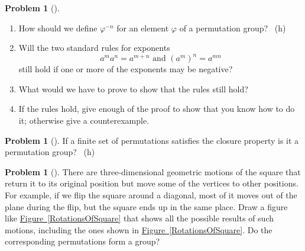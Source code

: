 \documentclass[10pt,]{book}
\theoremstyle{plain}
\theoremstyle{definition}
\newtheorem{activity}[project]{Problem}
\theoremstyle{definition}
\numberwithin{equation}{chapter}
\begin{document}
\begin{activity}[] \label{activity-253}
\leavevmode%
\begin{enumerate}[font=\bfseries,label=(\alph*),ref=\alph*]
\item\label{task-186} \marginsymbol[-2.5em]{} \hypertarget{p-1470}{}%
How should we define \(\varphi^{-n}\) for an element \(\varphi\) of a permutation group?%
~{\tiny (h)}\item\label{task-187} \marginsymbol[-2.5em]{} \hypertarget{p-1473}{}%
Will the two standard rules for exponents%
\begin{equation*}
a^ma^n=a^{m+n} \mbox{\ and\ }  (a^m)^n = a^{mn}
\end{equation*}
still hold if one or more of the exponents may be negative?%
\item\label{task-188} \marginsymbol[-2.5em]{} \hypertarget{p-1475}{}%
What would we have to prove to show that the rules still hold?%
\item\label{task-189} \marginsymbol[-2.5em]{} \hypertarget{p-1477}{}%
If the rules hold, give enough of the proof to show that you know how to do it; otherwise give a counterexample.%
\end{enumerate}
\end{activity}
\begin{activity}[] \label{activity-254}
\hypertarget{p-1481}{}%
If a finite set of permutations satisfies the closure property is it a permutation group?%
~{\tiny (h)}\end{activity}
\begin{activity}[] \label{dihedral1}
\hypertarget{p-1484}{}%
There are three-dimensional geometric motions of the square that return it to its original position but move some of the vertices to other positions. For example, if we flip the square around a diagonal, most of it moves out of the plane during the flip, but the square ends up in the same place. Draw a figure like \hyperref[RotationsOfSquare]{Figure~\ref{RotationsOfSquare}} that shows all the possible results of such motions, including the ones shown in \hyperref[RotationsOfSquare]{Figure~\ref{RotationsOfSquare}}. Do the corresponding permutations form a group?%
\end{activity}
\end{document}
